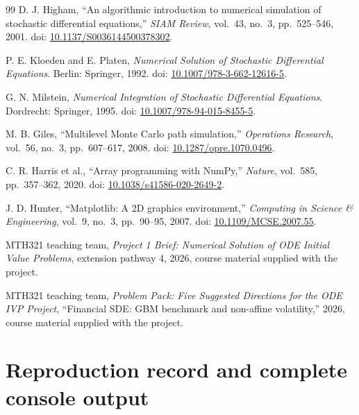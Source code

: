 \documentclass[11pt,a4paper]{article}
\theoremstyle{definition}
\theoremstyle{remark}
\begin{document}
\begin{thebibliography}{99}
D. J. Higham, ``An algorithmic introduction to numerical simulation of
stochastic differential equations,'' \emph{SIAM Review}, vol.~43, no.~3,
pp.~525--546, 2001. doi: \href{https://doi.org/10.1137/S0036144500378302}{10.1137/S0036144500378302}.

P. E. Kloeden and E. Platen, \emph{Numerical Solution of Stochastic
Differential Equations}. Berlin: Springer, 1992.
doi: \href{https://doi.org/10.1007/978-3-662-12616-5}{10.1007/978-3-662-12616-5}.

G. N. Milstein, \emph{Numerical Integration of Stochastic Differential
Equations}. Dordrecht: Springer, 1995.
doi: \href{https://doi.org/10.1007/978-94-015-8455-5}{10.1007/978-94-015-8455-5}.

M. B. Giles, ``Multilevel Monte Carlo path simulation,''
\emph{Operations Research}, vol.~56, no.~3, pp.~607--617, 2008.
doi: \href{https://doi.org/10.1287/opre.1070.0496}{10.1287/opre.1070.0496}.

C. R. Harris et al., ``Array programming with NumPy,'' \emph{Nature},
vol.~585, pp.~357--362, 2020.
doi: \href{https://doi.org/10.1038/s41586-020-2649-2}{10.1038/s41586-020-2649-2}.

J. D. Hunter, ``Matplotlib: A 2D graphics environment,''
\emph{Computing in Science \& Engineering}, vol.~9, no.~3, pp.~90--95, 2007.
doi: \href{https://doi.org/10.1109/MCSE.2007.55}{10.1109/MCSE.2007.55}.

MTH321 teaching team, \emph{Project 1 Brief: Numerical Solution of ODE Initial
Value Problems}, extension pathway 4, 2026, course material supplied with the
project.

MTH321 teaching team, \emph{Problem Pack: Five Suggested Directions for the ODE
IVP Project}, ``Financial SDE: GBM benchmark and non-affine volatility,'' 2026,
course material supplied with the project.
\end{thebibliography}

\appendix

\section{Reproduction record and complete console output}
\end{document}
